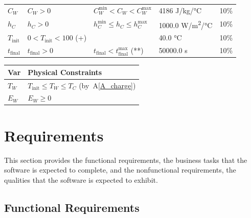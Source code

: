 \documentclass[12pt]{article}
\newcommand{\aref}[1]{A\ref{#1}}
\begin{document}
\begin{table}[!h]
\begin{longtable*}{l l l l c}
  \\
  $C_W$ & $C_W > 0$ & $C_W^{\text{min}} < C_W < C_W^{\text{max}}$ & 4186 
	\si[per-mode=symbol] {\joule\per\kilo\gram\per\celsius} & 10\%
  \\
  $h_C$ & $h_C > 0$ & $h_C^{\text{min}} \leq h_C \leq h_C^{\text{max}}$ 
	& 1000.0 \si[per-mode=symbol] {\watt\per\square\metre\per\celsius} & 10\%
  \\
  $T_\text{init}$ & $0 < T_\text{init} < 100 $ (+) & & 40.0 \si[per-mode=symbol] {\celsius} & 10\%
  \\
  $t_\text{final}$ & $t_\text{final} > 0$ & $t_\text{final} < t_{\text{final}}^{\text{max}}$ (**) 
		& 50000.0 \si[per-mode=symbol] {\second} & 10\%
  \\
  \bottomrule
\end{longtable*}
\end{table}



\begin{table}[!h]
\caption{Output Variables Constraints} \label{TblOutputVar}
\renewcommand{\arraystretch}{1.2}
\noindent \begin{longtable*}{l l} 
  \toprule
  \textbf{Var} & \textbf{Physical Constraints} \\
  \midrule 
  $T_W$ & $T_\text{init} \leq T_W \leq T_C$ (by~\aref{A_charge})
  \\
  $E_W$ & $E_W \geq 0$
  \\
  \bottomrule
\end{longtable*}
\end{table}

\section{Requirements}

This section provides the functional requirements, the business tasks that the
software is expected to complete, and the nonfunctional requirements, the
qualities that the software is expected to exhibit.

\subsection{Functional Requirements}
\end{document}
